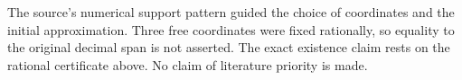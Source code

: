 \documentclass[11pt]{article}
\begin{document}
The source's numerical support pattern guided the choice of coordinates and the
initial approximation. Three free coordinates were fixed rationally, so equality
to the original decimal span is not asserted. The exact existence claim rests
on the rational certificate above. No claim of literature priority is made.
\end{document}
